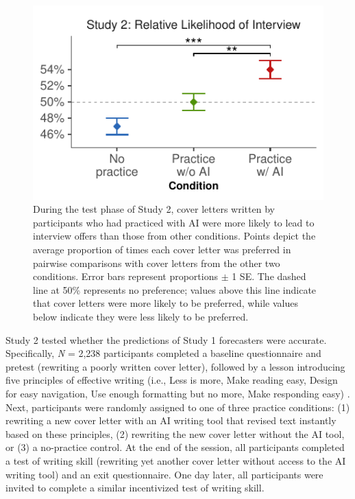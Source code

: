 \documentclass[11pt]{report}
\begin{document}
\begin{mainf}
\begin{figure}[t]
    \centering
    \includegraphics[width=1\linewidth]{ratings1.pdf}
    \caption{During the test phase of Study 2, cover letters written by participants who had practiced with AI were more likely to lead to interview offers than those from other conditions. Points depict the average proportion of times each cover letter was preferred in pairwise comparisons with cover letters from the other two conditions. Error bars represent proportions $\pm$ 1 SE. The dashed line at 50\% represents no preference; values above this line indicate that cover letters were more likely to be preferred, while values below indicate they were less likely to be preferred.}
    \label{fig:ratings1}
\end{figure}

Study 2 tested whether the predictions of Study 1 forecasters were
accurate. Specifically, \textit{N} = 2,238 participants completed a
baseline questionnaire and pretest (rewriting a poorly written cover
letter), followed by a lesson introducing five principles of effective
writing (i.e., Less is more, Make reading easy, Design for easy
navigation, Use enough formatting but no more, Make responding easy)
\cite{rogers2023}. 
Next, participants were randomly assigned to one of three practice conditions: (1) rewriting a new cover letter with an AI writing tool that revised text instantly based on these principles, (2) rewriting the new cover letter without the AI tool, or (3) a no-practice control. 
At the end of the session, all
participants completed a test of writing skill (rewriting yet another cover
letter without access to the AI writing tool) and an exit questionnaire.
One day later, all participants were invited to complete a similar
incentivized test of writing skill.



\end{mainf}
\end{document}
